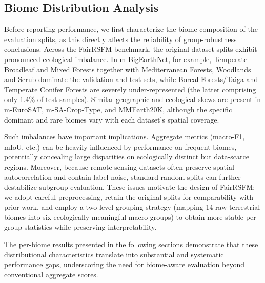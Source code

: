 \documentclass[10pt,twocolumn,letterpaper]{article}
\newcommand{\method}{FairRSFM\xspace}
\begin{document}
\subsection{Biome Distribution Analysis}

Before reporting performance, we first characterize the biome composition of the evaluation splits, as this directly affects the reliability of group-robustness conclusions. Across the \method benchmark, the original dataset splits exhibit pronounced ecological imbalance. In m-BigEarthNet, for example, Temperate Broadleaf and Mixed Forests together with Mediterranean Forests, Woodlands and Scrub dominate the validation and test sets, while Boreal Forests/Taiga and Temperate Conifer Forests are severely under-represented (the latter comprising only 1.4\% of test samples). Similar geographic and ecological skews are present in m-EuroSAT, m-SA-Crop-Type, and MMEarth20K, although the specific dominant and rare biomes vary with each dataset's spatial coverage.

Such imbalances have important implications. Aggregate metrics (macro-F1, mIoU, etc.) can be heavily influenced by performance on frequent biomes, potentially concealing large disparities on ecologically distinct but data-scarce regions. Moreover, because remote-sensing datasets often preserve spatial autocorrelation and contain label noise, standard random splits can further destabilize subgroup evaluation. These issues motivate the design of \method: we adopt careful preprocessing, retain the original splits for comparability with prior work, and employ a two-level grouping strategy (mapping 14 raw terrestrial biomes into six ecologically meaningful macro-groups) to obtain more stable per-group statistics while preserving interpretability.

The per-biome results presented in the following sections demonstrate that these distributional characteristics translate into substantial and systematic performance gaps, underscoring the need for biome-aware evaluation beyond conventional aggregate scores.
\end{document}
